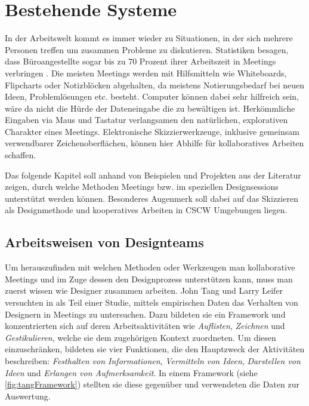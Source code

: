 \chapter{Bestehende Systeme}\label{ch:research}
In der Arbeitswelt kommt es immer wieder zu Situationen, in der sich mehrere Personen treffen um zusammen Probleme zu diskutieren. Statistiken besagen, dass Büroangestellte sogar bis zu 70 Prozent ihrer Arbeitszeit in Meetings verbringen \citep{panko:1993}. Die meisten Meetings werden mit Hilfsmitteln wie Whiteboards, Flipcharts oder Notizblöcken abgehalten, da meistens Notierungsbedarf bei neuen Ideen, Problemlösungen etc. besteht. Computer können dabei sehr hilfreich sein, wäre da nicht die Hürde der Dateneingabe die zu bewältigen ist. Herkömmliche Eingaben via Maus und Tastatur verlangsamen den natürlichen, explorativen Charakter eines Meetings. Elektronische Skizzierwerkzeuge, inklusive gemeinsam verwendbarer Zeichenoberflächen, können hier Abhilfe für kollaboratives Arbeiten schaffen. 

\medskip Das folgende Kapitel soll anhand von Beispielen und Projekten aus der Literatur zeigen, durch welche Methoden Meetings bzw. im speziellen Designsessions unterstützt werden können. Besonderes Augenmerk soll dabei auf das Skizzieren als Designmethode und kooperatives Arbeiten in \ac{CSCW} Umgebungen liegen.

\section{Arbeitsweisen von Designteams}
Um herauszufinden mit welchen Methoden oder Werkzeugen man kollaborative Meetings und im Zuge dessen den Designprozess unterstützen kann, muss man zuerst wissen wie Designer zusammen arbeiten. John Tang und Larry Leifer versuchten in \citep{Tang:1988p279} als Teil einer Studie, mittels empirischen Daten das Verhalten von Designern in Meetings zu untersuchen. Dazu bildeten sie ein Framework und konzentrierten sich auf deren Arbeitsaktivitäten wie \emph{Auflisten}, \emph{Zeichnen} und \emph{Gestikulieren}, welche sie dem zugehörigen Kontext zuordneten. Um diesen einzuschränken, bildeten sie vier Funktionen, die den Hauptzweck der Aktivitäten beschreiben: \emph{Festhalten von Informationen}, \emph{Vermitteln von Ideen}, \emph{Darstellen von Ideen} und \emph{Erlangen von Aufmerksamkeit}. In einem Framework (siehe \autoref{fig:tangFramework}) stellten sie diese gegenüber und verwendeten die Daten zur Auswertung.

